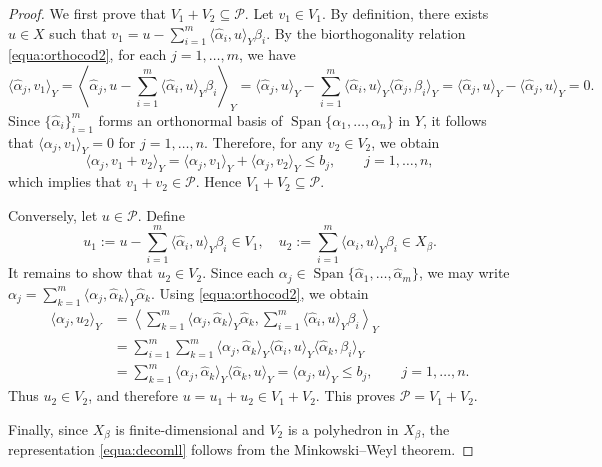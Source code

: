 \documentclass[10pt,a4paper]{amsart}
\begin{document}
\begin{proof}
We first prove that $V_1+V_2\subseteq\mathcal{P}$. Let $v_1\in V_1$. By definition, there exists $u\in X$ such that $
v_1=u-\sum_{i=1}^m \langle \hat{\alpha}_i,u\rangle_Y \beta_i.$
By the biorthogonality relation \eqref{equa:orthocod2}, for each $j=1,\dots,m$, we have
\begin{equation*}
    \langle \hat{\alpha}_j,v_1\rangle_Y=
\left\langle
\hat{\alpha}_j,
u-\sum_{i=1}^m \langle \hat{\alpha}_i,u\rangle_Y \beta_i
\right\rangle_Y=
\langle \hat{\alpha}_j,u\rangle_Y
-
\sum_{i=1}^m \langle \hat{\alpha}_i,u\rangle_Y \langle \hat{\alpha}_j,\beta_i\rangle_Y =
\langle \hat{\alpha}_j,u\rangle_Y-\langle \hat{\alpha}_j,u\rangle_Y
=0.
\end{equation*}
Since $\{\hat{\alpha}_i\}_{i=1}^m$ forms an orthonormal basis of $\operatorname{Span}\{\alpha_1,\dots,\alpha_n\}$ in $Y$, it follows that
$\langle \alpha_j,v_1\rangle_Y=0$ for $j=1,\dots,n$. Therefore, for any $v_2\in V_2$, we obtain
\begin{equation}
\langle \alpha_j,v_1+v_2\rangle_Y
=
\langle \alpha_j,v_1\rangle_Y+\langle \alpha_j,v_2\rangle_Y
\le b_j,
\qquad j=1,\dots,n,    
\end{equation}
which implies that $v_1+v_2\in\mathcal{P}$. Hence $V_1+V_2\subseteq\mathcal{P}$.

Conversely, let $u\in\mathcal{P}$. Define
\[
u_1:=u-\sum_{i=1}^m \langle \hat{\alpha}_i,u\rangle_Y\beta_i
\in V_1, \quad u_2:=\sum_{i=1}^m \langle \hat{\alpha}_i,u\rangle_Y\beta_i
\in X_\beta.
\]
It remains to show that $u_2\in V_2$. Since each $\alpha_j\in \operatorname{Span}\{\hat{\alpha}_1,\dots,\hat{\alpha}_m\}$, we may write
$\alpha_j=\sum_{k=1}^m \langle \alpha_j,\hat{\alpha}_k\rangle_Y \hat{\alpha}_k.$ Using \eqref{equa:orthocod2}, we obtain
\begin{equation*}
\begin{aligned}
\langle \alpha_j,u_2\rangle_Y
&=
\left\langle
\sum_{k=1}^m \langle \alpha_j,\hat{\alpha}_k\rangle_Y \hat{\alpha}_k,
\sum_{i=1}^m \langle \hat{\alpha}_i,u\rangle_Y \beta_i
\right\rangle_Y \\
&=
\sum_{i=1}^m \sum_{k=1}^m
\langle \alpha_j,\hat{\alpha}_k\rangle_Y
\langle \hat{\alpha}_i,u\rangle_Y
\langle \hat{\alpha}_k,\beta_i\rangle_Y \\
&=
\sum_{k=1}^m \langle \alpha_j,\hat{\alpha}_k\rangle_Y \langle \hat{\alpha}_k,u\rangle_Y
=
\langle \alpha_j,u\rangle_Y
\le b_j,
\qquad j=1,\dots,n.
\end{aligned}
\end{equation*}
Thus $u_2\in V_2$, and therefore $u=u_1+u_2\in V_1+V_2$. This proves $\mathcal{P}=V_1+V_2$.

Finally, since $X_\beta$ is finite-dimensional and $V_2$ is a polyhedron in $X_\beta$, the representation \eqref{equa:decomll} follows from the Minkowski--Weyl theorem.
\end{proof}
\end{document}
